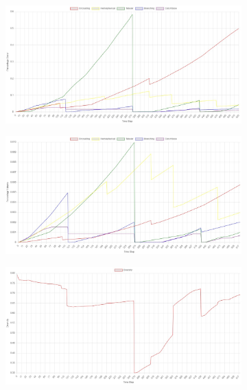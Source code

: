 \documentclass[9pt]{pnas-new}
\begin{document}
\begin{figure}[H]
    \centering
    \begin{subfigure}{0.35\textwidth}
        \includegraphics[width=\textwidth]{fig/low_chart_cover.jpg}
    \end{subfigure}
        \begin{subfigure}{0.35\textwidth}
        \includegraphics[width=\textwidth]{fig/low_chart_volume.jpg}
    \end{subfigure}
        \begin{subfigure}{0.35\textwidth}
        \includegraphics[width=\textwidth]{fig/low_chart_diversity.jpg}
    \end{subfigure}

\end{figure}
\end{document}
